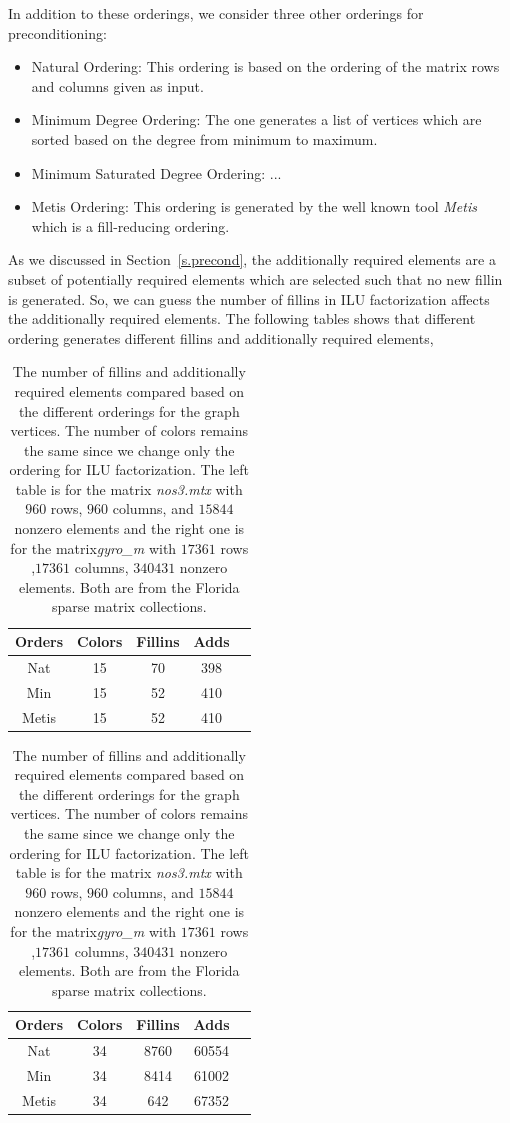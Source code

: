 \documentclass[12pt, oneside]{book}
\begin{document}
In addition to these orderings, we consider three other orderings for preconditioning:
\begin{itemize}
\item Natural Ordering: This ordering is based on the ordering of the matrix rows and columns given as input.
\item Minimum Degree Ordering: The one generates a list of vertices which are sorted based on the degree from minimum to maximum.
\item Minimum Saturated Degree Ordering: ...
\item Metis Ordering\cite{metis,par-nested-disection}: This ordering is generated by the well known
tool \textit{Metis} which is a fill-reducing ordering.
\end{itemize}
As we discussed in Section~\ref{s.precond}, the additionally required elements are a subset of 
potentially required elements which are selected such that no new fillin is generated. 
So, we can guess the number of fillins in ILU factorization affects the additionally required elements.
The following tables shows that different ordering generates different fillins and additionally
required elements,
\begin{table}
\begin{tabular}{|c|c|c|c|c|}
\hline
Orders & Colors & Fillins & Adds \\\hline
Nat & 15 & 70 & 398 \\\hline
Min & 15 & 52 & 410 \\\hline
Metis & 15 & 52 & 410 \\\hline
\end{tabular}
\hfill
\begin{tabular}{|c|c|c|c|c|}
\hline
Orders & Colors & Fillins & Adds \\\hline
Nat & 34 & 8760 & 60554 \\\hline
Min & 34 & 8414 & 61002 \\\hline
Metis & 34 & 642 & 67352 \\\hline
\end{tabular}
\caption{The number of fillins and additionally required elements compared based on the different orderings
for the graph vertices. The number of colors remains the same since we change only the ordering for
ILU factorization.
The left table is for the matrix \textit{nos3.mtx} with $960$ rows, $960$ columns, and $15844$ nonzero elements 
and the right one is for the matrix\textit{gyro\_m} with $17361$ rows ,$17361$ columns, $340431$ nonzero elements.
Both are from the Florida sparse matrix collections.}
\label{ilu-effect}
\end{table}
\end{document}

